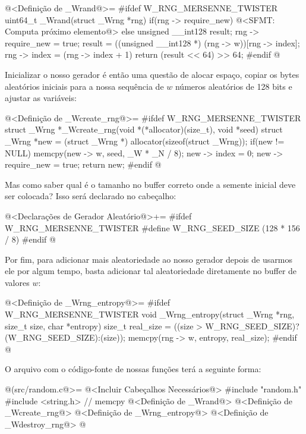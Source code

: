 \iniciocodigo
@<Definição de \_Wrand@>=
#ifdef W_RNG_MERSENNE_TWISTER
uint64_t _Wrand(struct _Wrng *rng){
  if(rng -> require_new){
    @<SFMT: Computa próximo elemento@>
  }
  else{
    unsigned __int128 result;
    rng -> require_new = true;
    result = ((unsigned __int128 *) (rng -> w))[rng -> index];
    rng -> index = (rng -> index + 1) %
    return (result << 64) >> 64;
  }
}
#endif
@
\fimcodigo

Inicializar o nosso gerador é então uma questão de alocar espaço,
copiar os bytes aleatórios iniciais para a nossa sequência de $w$
números aleatórios de 128 bits e ajustar as variáveis:

\iniciocodigo
@<Definição de \_Wcreate\_rng@>=
#ifdef W_RNG_MERSENNE_TWISTER
struct _Wrng *_Wcreate_rng(void *(*allocator)(size_t), void *seed){
  struct _Wrng *new = (struct _Wrng *) allocator(sizeof(struct _Wrng));
  if(new != NULL){
    memcpy(new -> w, seed, _W * _N / 8);
    new -> index = 0;
    new -> require_new = true;
  }
  return new;
}
#endif
@
\fimcodigo

Mas como saber qual é o tamanho no buffer correto onde a semente
inicial deve ser colocada? Isso será declarado no cabeçalho:

\iniciocodigo
@<Declarações de Gerador Aleatório@>+=
#ifdef W_RNG_MERSENNE_TWISTER
#define W_RNG_SEED_SIZE (128 * 156 / 8)
#endif
@
\fimcodigo

Por fim, para adicionar mais aleatoriedade ao nosso gerador depois de
usarmos ele por algum tempo, basta adicionar tal aleatoriedade
diretamente no buffer de valores $w$:

\iniciocodigo
@<Definição de \_Wrng\_entropy@>=
#ifdef W_RNG_MERSENNE_TWISTER
void _Wrng_entropy(struct _Wrng *rng, size_t size, char *entropy){
  size_t real_size = ((size > W_RNG_SEED_SIZE)?(W_RNG_SEED_SIZE):(size));
  memcpy(rng -> w, entropy, real_size);
}
#endif
@
\fimcodigo


O arquivo com o código-fonte de nossas funções terá a seguinte forma:


\iniciocodigo
@(src/random.c@>=
@<Incluir Cabeçalhos Necessários@>
#include "random.h"
#include <string.h> // memcpy
@<Definição de \_Wrand@>
@<Definição de \_Wcreate\_rng@>
@<Definição de \_Wrng\_entropy@>
@<Definição de \_Wdestroy\_rng@>
@
\fimcodigo






\fim

